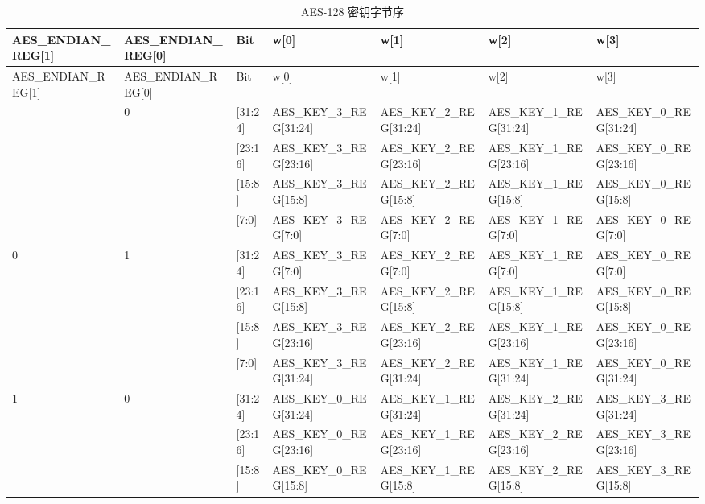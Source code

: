 \documentclass[main\_\_CN.tex]{subfiles}
\begin{document}
\begin{landscape}

\begin{tiny}
\begin{longtable}[c]
{ |p{2cm}|p{2cm}|p{1cm}|p{2.5cm}|p{2.5cm}|p{2.5cm}|p{2.5cm}|}
\caption{AES-128 密钥字节序}\label{table:AES128KeyEndian}\\
\hline
\rowcolor{lightgray}
AES\_ENDIAN\_REG[1]	&	AES\_ENDIAN\_REG[0]	&	Bit	&	w[0]	&	w[1]	&	w[2] 	&	w[3]	\\\hline
\endfirsthead
\hline
\rowcolor{lightgray}
AES\_ENDIAN\_REG[1]	&	AES\_ENDIAN\_REG[0]	&	Bit	&	w[0]	&	w[1]	&	w[2] 	&	w[3]	\\\hline
\endhead
\endfoot
\multirow{4}{4cm}{0} 	&	\multirow{4}{4cm}{0}	&	[31:24] 	&	AES\_KEY\_3\_REG[31:24]	&	AES\_KEY\_2\_REG[31:24]	& AES\_KEY\_1\_REG[31:24]	&	AES\_KEY\_0\_REG[31:24]\\
\cline{3-7}
&&	[23:16] 	&	AES\_KEY\_3\_REG[23:16]	&	AES\_KEY\_2\_REG[23:16] 	&	AES\_KEY\_1\_REG[23:16]	&	AES\_KEY\_0\_REG[23:16]\\
\cline{3-7}
&&	[15:8]	&	AES\_KEY\_3\_REG[15:8]	&	AES\_KEY\_2\_REG[15:8] 	&	AES\_KEY\_1\_REG[15:8]	&	AES\_KEY\_0\_REG[15:8]\\
\cline{3-7}
&&	[7:0]	&	AES\_KEY\_3\_REG[7:0]	&	AES\_KEY\_2\_REG[7:0] 	&	AES\_KEY\_1\_REG[7:0]	&	AES\_KEY\_0\_REG[7:0]\\
\hline
\multirow{4}{4cm}{0} 	&	\multirow{4}{4cm}{1}	&	[31:24] 	&	AES\_KEY\_3\_REG[7:0]	&	AES\_KEY\_2\_REG[7:0] 	&	AES\_KEY\_1\_REG[7:0]	&	AES\_KEY\_0\_REG[7:0]\\
\cline{3-7}
&&	[23:16] 	&	AES\_KEY\_3\_REG[15:8]	&	AES\_KEY\_2\_REG[15:8] 	&	AES\_KEY\_1\_REG[15:8]	&	AES\_KEY\_0\_REG[15:8]\\
\cline{3-7}
&&	[15:8] 	&	AES\_KEY\_3\_REG[23:16]	&	AES\_KEY\_2\_REG[23:16] 	&	AES\_KEY\_1\_REG[23:16]	&	AES\_KEY\_0\_REG[23:16]\\
\cline{3-7}
&&	[7:0]	&	AES\_KEY\_3\_REG[31:24]	&	AES\_KEY\_2\_REG[31:24]	& AES\_KEY\_1\_REG[31:24]	&	AES\_KEY\_0\_REG[31:24]\\
\hline
\multirow{4}{4cm}{1} 	&	\multirow{4}{4cm}{0}	&	[31:24] 	&	AES\_KEY\_0\_REG[31:24]	&	AES\_KEY\_1\_REG[31:24]	& AES\_KEY\_2\_REG[31:24]	&	AES\_KEY\_3\_REG[31:24]\\
\cline{3-7}
&&	[23:16] 	&	AES\_KEY\_0\_REG[23:16]	&	AES\_KEY\_1\_REG[23:16] 	&	AES\_KEY\_2\_REG[23:16]	&	AES\_KEY\_3\_REG[23:16]\\
\cline{3-7}
&&	[15:8]	&	AES\_KEY\_0\_REG[15:8]	&	AES\_KEY\_1\_REG[15:8] 	&	AES\_KEY\_2\_REG[15:8]	&	AES\_KEY\_3\_REG[15:8]\\

\end{longtable}
\end{tiny}
\end{landscape}
\end{document}
